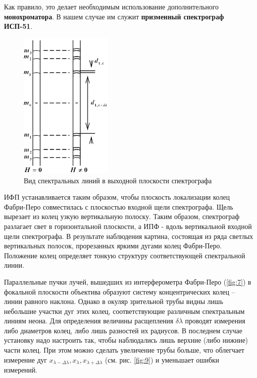 Как правило, это делает необходимым использование дополнительного \textbf{монохроматора}. В нашем случае им служит \textbf{призменный спектрограф ИСП-51}.
\begin{figure}[H]
\begin{center}
\includegraphics[width=0.4\textwidth]{fig/fig8.jpg}
\caption{Вид спектральных линий в выходной плоскости спектрографа}\label{fig:8}
\end{center}

\end{figure}
ИФП устанавливается таким образом, чтобы плоскость локализации колец Фабри-Перо совместилась с плоскостью входной щели спектрографа. Щель вырезает из колец узкую вертикальную полоску. Таким образом, спектрограф разлагает свет в горизонтальной плоскости, а ИПФ - вдоль вертикальной входной щели спектрографа. В результате наблюдения картина, состоящая из ряда светлых вертикальных полосок, прорезанных яркими дугами колец Фабри-Перо. Положение колец определяет тонкую структуру соответствующей спектральной линии. 

Параллельные пучки лучей, вышедших из интерферометра Фабри-Перо (\ref{fig:7}) в фокальной плоскости объектива образуют систему концентрических колец -- линии равного наклона. Однако в окуляр зрительной трубы видны лишь небольшие участки дуг этих колец, соответствующие различным спектральным линиям неона. Для определения величины расщепления $\delta\lambda$ проводят измерения либо диаметров колец, либо лишь разностей их радиусов. В последнем случае установку надо настроить так, чтобы наблюдались лишь верхние (либо нижние) части колец. При этом можно сделать увеличение трубы больше, что облегчает измерение дуг $x_{\lambda-\Delta \lambda},x_{\lambda},x_{\lambda+\Delta \lambda}$ (см. рис. \ref{fig:9}) и уменьшает ошибки измерений.

